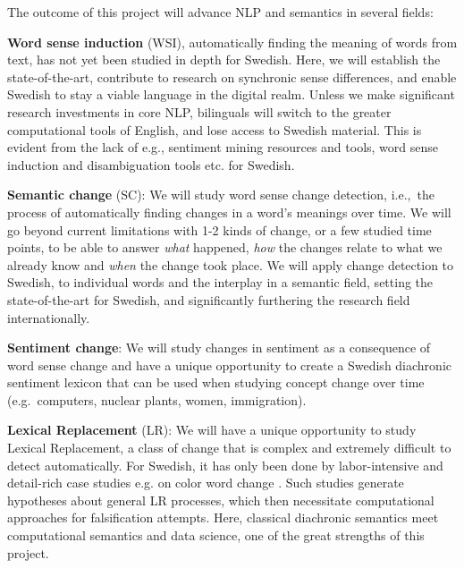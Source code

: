 \documentclass[12pt,twoside,a4paper]{article}
\newcommand\eg{{e.g.\ }}
\newcommand\ie{{i.e.,\ }}
\begin{document}
	The outcome of this project will advance NLP and semantics in several fields: 
	\begin{compactitem}
		\item	\textbf{Word sense induction} (WSI), automatically finding the meaning of words from text, has not yet been studied in depth for Swedish. Here, we will establish the state-of-the-art, contribute to research on synchronic sense differences, and enable Swedish to stay a viable language in the digital realm. Unless we make significant research investments in core NLP, bilinguals will switch to the greater computational tools of English, and lose access to Swedish material. This is evident from the lack of e.g., sentiment mining resources and tools, word sense induction and disambiguation tools etc. for Swedish.
		\item \textbf{Semantic change} (SC): 	We will study word sense        change detection, \ie the process of automatically finding changes in a word's meanings over time. We will go beyond current limitations with 1-2 kinds of change, or a few studied time points, to be able to answer \textit{what} happened,  \textit{how} the changes relate to what we already know and \textit{when} the change took place. We will apply change detection to Swedish, to individual words and the interplay in a semantic field, setting the state-of-the-art for Swedish, and significantly furthering the research field internationally.
		\item	\textbf{Sentiment change}: We will study changes in sentiment as a consequence of word sense  change and have a unique opportunity to create a Swedish diachronic sentiment lexicon that can be used when studying concept change over time (\eg computers, nuclear plants, women, immigration). 
		\item	\textbf{Lexical Replacement} (LR): We will have a unique opportunity to study Lexical Replacement, a class of change that is complex and extremely difficult to detect automatically. For Swedish, it has only been done by labor-intensive and detail-rich case studies e.g. on color word change \citep{vejdemo_triangulating_2017-a}. Such studies generate hypotheses about general LR processes, which then necessitate computational approaches for falsification attempts. Here, classical diachronic semantics meet computational semantics and data science, one of the great strengths of this project. 		
	\end{compactitem}
  \vspace{-0.4cm}   	
\end{document}
